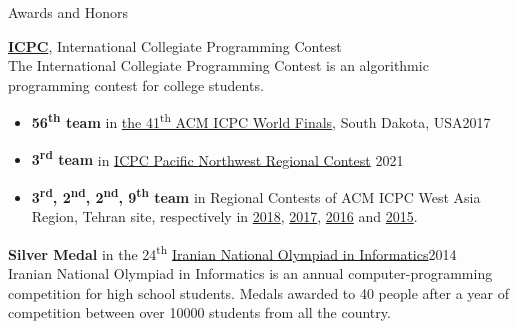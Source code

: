 \documentclass{resume} %
\begin{document}
\begin{rSection}{Awards and Honors}
	
	{\bf \href{http://icpc.baylor.edu/}{ICPC}}, International Collegiate Programming Contest
	\\The International Collegiate Programming Contest is an algorithmic programming contest for college students.
	\smallskip
	\vspace{-0.5em}
	\begin{itemize}[leftmargin=3mm]
		\setlength{\itemsep}{1pt}
		\setlength{\parskip}{0pt}
		\setlength{\parsep}{0pt}
		\renewcommand\labelitemi{$\cdot$}

		\item {\bf 56\textsuperscript{th} team} in
		\href{https://icpc.baylor.edu/community/results-2017}{the 41\textsuperscript{th} ACM ICPC World Finals},
		South Dakota, USA\hfill 2017
		
		\item {\bf 3\textsuperscript{rd} team} in \href{http://www.acmicpc-pacnw.org/scoreboard/2020/index1.html}{ICPC Pacific Northwest Regional Contest}
		\hfill 2021

		\item {\bf 3\textsuperscript{rd}, 2\textsuperscript{nd}, 2\textsuperscript{nd}, 9\textsuperscript{th} team} in Regional Contests of ACM ICPC West Asia Region,
		Tehran site, respectively in
		\href{http://icpc.sharif.edu/acmicpc18/scoreboard/}{2018},
		\href{http://icpc.sharif.edu/acmicpc17/scoreboard/}{2017},
		\href{http://icpc.sharif.edu/acmicpc16/scoreboard/}{2016} and
		\href{http://icpc.sharif.edu/acmicpc15/scoreboard/}{2015}.
	\end{itemize}
	
	{\bf Silver Medal} in the 24\textsuperscript{th} \href{http://inoi.ir/}{Iranian National Olympiad in Informatics}\hfill 2014
	\smallskip
	\\Iranian National Olympiad in Informatics is an annual computer-programming competition for high school students. Medals awarded to 40 people after a year of competition between over 10000 students from all the country.

\end{rSection}
\end{document}
